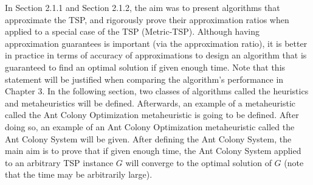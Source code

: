 \documentclass[12pt]{article}
\numberwithin{equation}{subsection}
\numberwithin{table}{subsection}
\begin{document}
In Section 2.1.1 and Section 2.1.2, the aim was to present algorithms that approximate the TSP, and rigorously prove their approximation ratios when applied to a special case of the TSP (Metric-TSP). Although having approximation guarantees is important (via the approximation ratio), it is better in practice in terms of accuracy of approximations to design an algorithm that is guaranteed to find an optimal solution if given enough time. Note that this statement will be justified when comparing the algorithm's performance in Chapter 3. In the following section, two classes of algorithms called the heuristics and metaheuristics will be defined. Afterwards, an example of a metaheuristic called the Ant Colony Optimization metaheuristic is going to be defined. After doing so, an example of an Ant Colony Optimization metaheuristic called the Ant Colony System will be given. After defining the Ant Colony System, the main aim is to prove that if given enough time, the Ant Colony System applied to an arbitrary TSP instance $G$ will converge to the optimal solution of $G$ (note that the time may be arbitrarily large).
\end{document}
